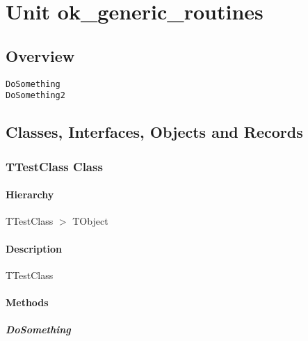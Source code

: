 \documentclass{report}
\begin{document}
\newlength{\tmplength}
\chapter{Unit ok{\_}generic{\_}routines}
\section{Overview}
\begin{description}
\item[\texttt{\begin{ttfamily}TTestClass\end{ttfamily} Class}]
\end{description}
\begin{description}
\item[\texttt{DoSomething}]
\item[\texttt{DoSomething2}]
\end{description}
\section{Classes, Interfaces, Objects and Records}
\subsection*{TTestClass Class}
\subsubsection*{\large{\textbf{Hierarchy}}\normalsize\hspace{1ex}\hfill}
TTestClass {$>$} TObject
\subsubsection*{\large{\textbf{Description}}\normalsize\hspace{1ex}\hfill}
TTestClass\subsubsection*{\large{\textbf{Methods}}\normalsize\hspace{1ex}\hfill}
\paragraph*{DoSomething}\hspace*{\fill}
\end{document}

